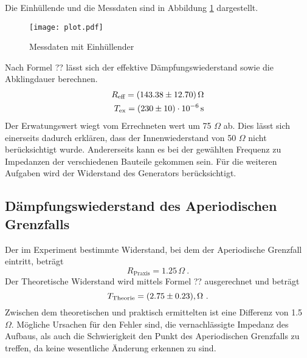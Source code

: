 Die Einhüllende und die Messdaten sind in Abbildung \ref{fig:Osz} dargestellt.
\begin{figure}
  \centering
  \texttt{[image: plot.pdf]}
  \caption{Messdaten mit Einhüllender}
  \label{fig:Osz}
\end{figure}
Nach Formel ?? lässt sich der effektive Dämpfungswiederstand sowie die Abklingdauer berechnen.
\begin{eqnarray}
  R_\text{eff} = ( \num{143.38 +- 12.7}) \, \Omega \\
  T_\text{ex} = ( \num{230 +- 10}) \cdot 10^{-6} \, \text{s}
  \label{eqn:Reff}
\end{eqnarray}
Der Erwatungswert wiegt vom Errechneten wert um 75 $\Omega$ ab. Dies lässt sich einerseits dadurch erklären, dass der Innenwiederstand von 50 $\Omega$ nicht berücksichtigt wurde. Andererseits kann es bei der gewählten Frequenz zu Impedanzen der verschiedenen Bauteile gekommen sein. Für die weiteren Aufgaben wird der Widerstand des Generators berücksichtigt.
\subsection{Dämpfungswiederstand des Aperiodischen Grenzfalls}
Der im Experiment bestimmte Widerstand, bei dem der Aperiodische Grenzfall eintritt, beträgt
\begin{equation}
  R_\text{Praxis} = 1.25 \, \Omega \ .
  \label{eqn:Rprax}
\end{equation}
Der Theoretische Widerstand wird mittels Formel ?? ausgerechnet und beträgt 
\begin{equation}
  T_\text{Theorie} = (\num{2.75 +- 0.23}) , \Omega \ .
  \label{eqn:Rthe}
\end{equation}
Zwischen dem theoretischen und praktisch ermittelten ist eine Differenz von 1.5 $\Omega$. Mögliche Ursachen für den Fehler sind, die vernachlässigte Impedanz des Aufbaus, als auch die Schwierigkeit den Punkt des Aperiodischen Grenzfalls zu treffen, da keine wesentliche Änderung erkennen zu sind. 

